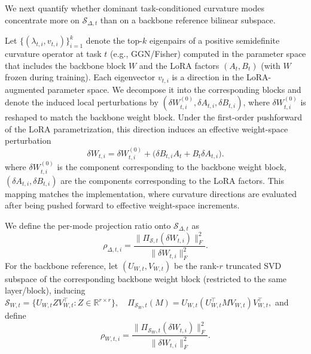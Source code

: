 \documentclass{article}
\theoremstyle{plain}
\theoremstyle{definition}
\theoremstyle{remark}
\begin{document}
We next quantify whether dominant task-conditioned curvature modes concentrate more on $\mathcal S_{\Delta,t}$ than on a backbone reference bilinear subspace.

Let $\{(\lambda_{t,i}, v_{t,i})\}_{i=1}^k$ denote the top-$k$ eigenpairs of a positive semidefinite curvature operator at task $t$ (e.g., GGN/Fisher) computed in the parameter space that includes the backbone block $W$ and the LoRA factors $(A_t,B_t)$ (with $W$ frozen during training).
Each eigenvector $v_{t,i}$ is a direction in the LoRA-augmented parameter space.
We decompose it into the corresponding blocks and denote the induced local perturbations by
$(\delta W_{t,i}^{(0)}, \delta A_{t,i}, \delta B_{t,i})$,
where $\delta W_{t,i}^{(0)}$ is reshaped to match the backbone weight block.
Under the first-order pushforward of the LoRA parametrization, this direction induces an effective weight-space perturbation
\[
\delta W_{t,i}
=
\delta W_{t,i}^{(0)} + \big(\delta B_{t,i}A_t + B_t \delta A_{t,i}\big).
\]
where $ \delta W_{t,i}^{(0)}$ is the component corresponding to the backbone weight block, $(\delta A_{t,i},\delta B_{t,i})$ are the components corresponding to the LoRA factors.
This mapping matches the implementation, where curvature directions are evaluated after being pushed forward to effective weight-space increments.

We define the per-mode projection ratio onto $\mathcal S_{\Delta,t}$ as
$$
\rho_{\Delta,t,i}
=\frac{\|\Pi_{\mathcal S,t}(\delta W_{t,i})\|_F^2}{\|\delta W_{t,i}\|_F^2}.
$$
For the backbone reference, let $(U_{W,t},V_{W,t})$ be the rank-$r$ truncated SVD subspace of the corresponding backbone weight block (restricted to the same layer/block), inducing
$
\mathcal S_{W,t}=\{U_{W,t} Z V_{W,t}^\top : Z\in\mathbb{R}^{r\times r}\},
\quad
\Pi_{\mathcal S_W,t}(M)=U_{W,t}(U_{W,t}^\top M V_{W,t})V_{W,t}^\top,
$
and define
$$\rho_{W,t,i}
=\frac{\|\Pi_{\mathcal S_W,t}(\delta W_{t,i})\|_F^2}{\|\delta W_{t,i}\|_F^2}.
$$
\end{document}
